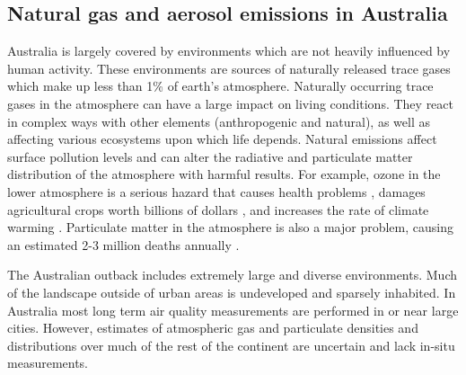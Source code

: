 \subsection{Natural gas and aerosol emissions in Australia}

Australia is largely covered by environments which are not heavily influenced by human activity.
These environments are sources of naturally released trace gases which make up less than 1\% of earth's atmosphere.
Naturally occurring trace gases in the atmosphere can have a large impact on living conditions.
They react in complex ways with other elements (anthropogenic and natural), as well as affecting various ecosystems upon which life depends.
Natural emissions affect surface pollution levels and can alter the radiative and particulate matter distribution of the atmosphere with harmful results.
For example, ozone in the lower atmosphere is a serious hazard that causes health problems \cite{Hsieh_2013}, damages agricultural crops worth billions of dollars \cite{Avnery_2011}, and increases the rate of climate warming \cite{IPCC_2013_chap8}.
Particulate matter in the atmosphere is also a major problem, causing an estimated 2-3 million deaths annually \cite{Hoek_2013, 19627030, Silva_2013, Lelieveld_2015}.

The Australian outback includes extremely large and diverse environments.
Much of the landscape outside of urban areas is undeveloped and sparsely inhabited.
In Australia most long term air quality measurements are performed in or near large cities.
However, estimates of atmospheric gas and particulate densities and distributions over much of the rest of the continent are uncertain and lack in-situ measurements.
